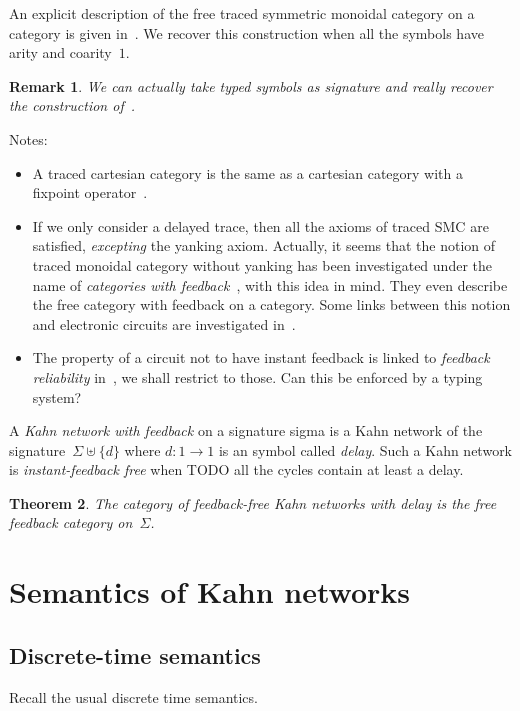 \documentclass{article}
\newtheorem{theorem}{Theorem}
\newtheorem{remark}[theorem]{Remark}
\begin{document}
An explicit description of the free traced symmetric monoidal category on a
category is given in~\cite{abramsky:traced-compact-closed}. We recover this
construction when all the symbols have arity and coarity~$1$.

\begin{remark}
  We can actually take typed symbols as signature and really recover the
  construction of~\cite{abramsky:traced-compact-closed}.
\end{remark}

Notes:
\begin{itemize}
\item A traced cartesian category is the same as a cartesian category with a
  fixpoint operator~\cite{hasegawa1997recursion}.
\item If we only consider a delayed trace, then all the axioms of traced SMC are
  satisfied, \emph{excepting} the yanking axiom. Actually, it seems that the
  notion of traced monoidal category without yanking has been investigated under
  the name of \emph{categories with feedback}~\cite{katis2002feedback}, with
  this idea in mind. They even describe the free category with feedback on a
  category. Some links between this notion and electronic circuits are
  investigated in~\cite{katis1999algebra}.
\item The property of a circuit not to have instant feedback is linked to
  \emph{feedback reliability} in~\cite{pardo2004synchronous}, we shall restrict
  to those. Can this be enforced by a typing system?
\end{itemize}

A \emph{Kahn network with feedback} on a signature sigma is a Kahn network of
the signature~$\Sigma\uplus\{d\}$ where $d:1\to 1$ is an symbol called
\emph{delay}. Such a Kahn network is \emph{instant-feedback free} when TODO all
the cycles contain at least a delay.

\begin{theorem}
  The category of feedback-free Kahn networks with delay is the free feedback
  category on~$\Sigma$.
\end{theorem}

\section{Semantics of Kahn networks}
\subsection{Discrete-time semantics}
Recall the usual discrete time semantics.
\end{document}
